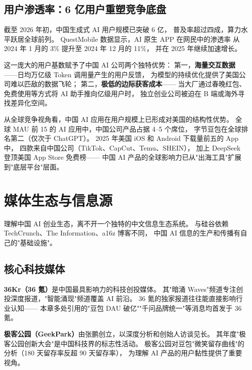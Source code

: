 \subsection{用户渗透率：6 亿用户重塑竞争底盘}
\label{subsec:china-user-penetration}

截至 2026 年初，中国生成式 AI 用户规模已突破 6 亿，
普及率超过四成，算力水平跃居全球前列。
QuestMobile 数据显示，AI 原生 APP 在网民中的渗透率
从 2024 年 1 月的 3\% 提升至 2024 年 12 月的 11\%，
并在 2025 年继续加速增长。

这一庞大的用户基数赋予了中国 AI 公司两个独特优势：
第一，\textbf{海量交互数据}——日均万亿级 Token 调用量产生的用户反馈，
为模型的持续优化提供了美国公司难以匹敌的数据飞轮；
第二，\textbf{极低的边际获客成本}——
当大厂通过春晚红包、免费使用等方式将 AI 助手推向亿级用户时，
独立创业公司被迫在 B 端或海外寻找差异化空间。

从全球竞争视角看，中国 AI 应用在用户规模上已形成对美国的结构性优势。
全球 MAU 前 15 的 AI 应用中，中国公司产品占据 4--5 个席位，
字节豆包在全球排名第二（仅次于 ChatGPT）。
2025 年美国 iOS 和 Android 下载量前五的 App 中，
四款来自中国公司（TikTok、CapCut、Temu、SHEIN），
加上 DeepSeek 登顶美国 App Store 免费榜——
中国 AI 产品的全球影响力已从"出海工具"扩展到"底层平台"层面。



\section{媒体生态与信息源}
\label{sec:china-media}

理解中国 AI 创业生态，离不开一个独特的中文信息生态系统。
与硅谷依赖 TechCrunch、The Information、a16z 博客不同，
中国 AI 信息的生产和传播有自己的"基础设施"。

\subsection{核心科技媒体}
\label{subsec:china-tech-media}

\textbf{36Kr（36 氪）}是中国最具影响力的科技创投媒体。
其"暗涌 Waves"频道专注创投深度报道，"智能涌现"频道覆盖 AI 前沿。
36 氪的独家报道往往能直接影响行业认知——
本章多处引用的"豆包 DAU 破亿""千问品牌统一"等消息均首发于 36 氪。

\textbf{极客公园（GeekPark）}由张鹏创立，以深度分析和创始人访谈见长。
其年度"极客公园创新大会"是中国科技界的标志性活动。
极客公园对豆包"微笑留存曲线"的分析（180 天留存率反超 90 天留存率），
为理解 AI 产品的用户黏性提供了重要视角。

